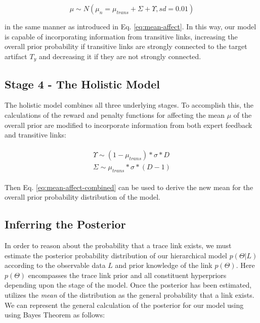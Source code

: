 \begin{equation}\label{eq:mean-affect-combined}
	\mu \sim N(\mu_n= \mu_{trans} + \Sigma + \Upsilon, sd=0.01)
\end{equation}

\noindent in the same manner as introduced in Eq. \ref{eq:mean-affect}. In this way, our model is capable of incorporating information from transitive links, increasing the overall prior probability if transitive links are strongly connected to the target artifact $T_y$ and decreasing it if they are not strongly connected.

\subsection{Stage 4 - The Holistic Model}
\label{sub:model-comp4}

The holistic model combines all three underlying stages. To accomplish this, the calculations of the reward and penalty functions for affecting the mean $\mu$ of the overall prior are modified to incorporate information from both expert feedback and transitive links:

\begin{align}
\begin{split}
	\Upsilon \sim (1-\mu_{trans})*\sigma*D \\
	\Sigma \sim \mu_{trans}*\sigma*(D-1)
\end{split}
\end{align}

\noindent Then Eq. \ref{eq:mean-affect-combined} can be used to derive the new mean for the overall prior probability distribution of the model.

\subsection{Inferring the Posterior}
\label{sub:model-posterior}

In order to reason about the probability that a trace link exists, we must estimate the posterior probability distribution of our hierarchical model $p(\Theta|L)$ according to the observable data $L$ and prior knowledge of the link $p(\Theta)$. Here $p(\Theta)$ encompasses the trace link prior and all constituent hyperpriors depending upon the stage of the model.  Once the posterior has been estimated, \Comet utilizes the \textit{mean} of the distribution as the general probability that a link exists. We can represent the general calculation of the posterior for our model using using Bayes Theorem as follows:  

